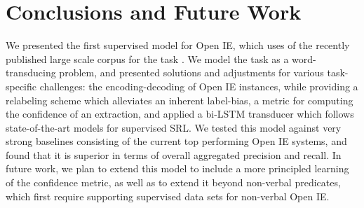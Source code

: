 \documentclass[11pt,letterpaper]{article}
\begin{document}
\section{Conclusions and Future Work}
\label{sec:conclusions}
We presented the first supervised model for Open IE,
which uses of the recently published large scale corpus for the task \cite{Stanovsky2016EMNLP}.
We model the task as a word-transducing problem, and presented solutions and
adjustments for various task-specific challenges: the encoding-decoding of Open IE instances, while providing a relabeling scheme which alleviates an inherent label-bias, a metric for computing the confidence of an extraction,
and applied a bi-LSTM transducer which follows state-of-the-art models for supervised SRL.
We tested this model against very strong baselines consisting of the current top performing Open IE systems, and
found that it is superior in terms of overall aggregated precision and recall.
In future work, we plan to extend this model to include a more principled learning of the confidence metric,
as well as to extend it beyond non-verbal predicates, which first require supporting supervised
data sets for non-verbal Open IE.


\end{document}
